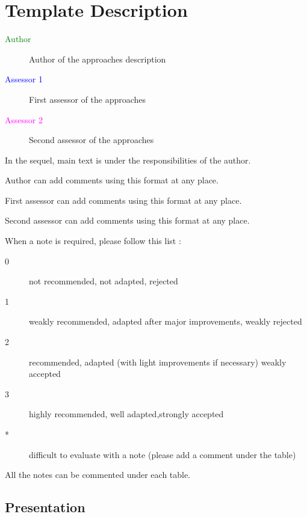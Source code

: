 \chapter{Template Description}
\label{sec:template}

\begin{description}
\item[\textcolor{green}{Author}] Author of the approaches description  
\item[\textcolor{blue}{Assessor 1}] First assessor of the approaches 
\item[\textcolor{magenta}{Assessor 2}] Second assessor of the approaches 
\end{description}

In the sequel, main text is under the responsibilities of the author.

\begin{author_comment}
Author can add comments using this format at any place.
\end{author_comment}

\begin{assessor1}
First assessor can add comments using this format at any place.
\end{assessor1}

\begin{assessor2}
Second assessor can add comments using this format at any place.
\end{assessor2}

When a note is required, please follow this list :
\begin{description}
\item[0] not recommended, not adapted, rejected
\item[1] weakly recommended, adapted after major improvements, weakly rejected
\item[2] recommended, adapted (with light improvements if necessary)  weakly accepted
\item[3] highly recommended, well adapted,strongly accepted
\item[*] difficult to evaluate with a note (please add a comment under the table)
\end{description}

All the notes can be commented under each table.

\section{Presentation}

